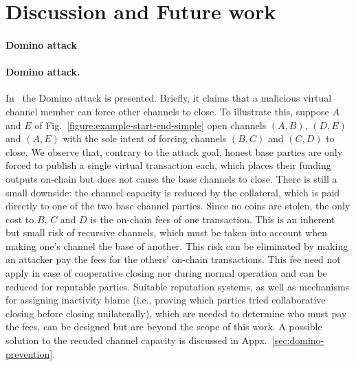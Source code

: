 \section{Discussion and Future work}
\label{sec:future-work}
\makeatletter%
%
  {\paragraph{Domino attack}}%
  {\paragraph{Domino attack.}}%
\makeatother%
In~\cite{donner} the Domino attack is presented. Briefly, it claims that a
malicious virtual channel member can force other channels to close. To
illustrate this, suppose $A$ and $E$ of
Fig.~\ref{figure:example-start-end-simple} open
channels
$(A, B)$, $(D, E)$ and $(A, E)$ with the sole intent of forcing channels $(B,
C)$ and $(C, D)$ to close. We observe that, contrary to the attack goal, honest
base parties are only
forced to publish a single virtual transaction each, which places their funding
outputs on-chain but does not cause the base channels to close. There is still a
small downside:
the channel capacity is reduced by the collateral, which
is paid directly to one of the two base channel parties. Since no coins are
stolen, the only cost to $B$, $C$ and $D$ is the on-chain fees
of one transaction. This is an inherent but small risk of
recursive channels, which must be taken into account when making one's
channel the base of another. This risk can be eliminated by making an attacker
pay the fees for the others' on-chain transactions. This fee need not apply in
case of cooperative closing nor
during normal operation and can be reduced for reputable parties.
Suitable reputation systems, as well as mechanisms for assigning inactivity
blame (i.e., proving which parties tried collaborative closing before
closing unilaterally), which are needed to determine who must pay the fees,
can be designed but are beyond the scope of this work. A possible solution to
the recuded channel capacity is discussed in Appx.~\ref{sec:domino-prevention}.


